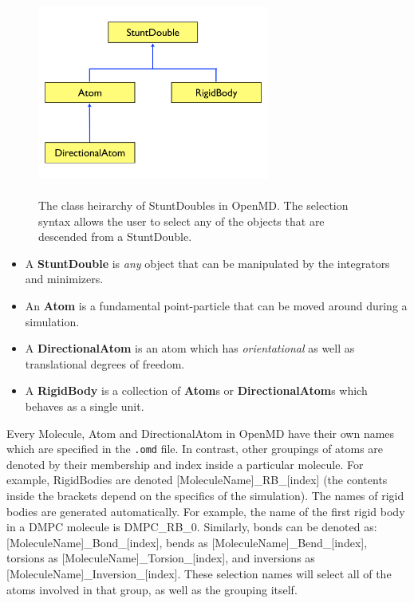 \documentclass[letterpaper]{report}
\begin{document}
\begin{figure}
\centering
\includegraphics[width=3in]{heirarchy.pdf}
\caption[Class heirarchy for StuntDoubles in OpenMD]{ \\ The
class heirarchy of StuntDoubles in OpenMD. The selection
syntax allows the user to select any of the objects that are descended
from a StuntDouble.}
\label{fig:heirarchy}
\end{figure}

\begin{itemize}
\item A {\bf StuntDouble} is {\it any} object that can be manipulated by the
integrators and minimizers. 
\item An {\bf Atom} is a fundamental point-particle that can be moved around during a simulation.
\item A {\bf DirectionalAtom} is an atom which has {\it orientational} as well as translational degrees of freedom.
\item A {\bf RigidBody} is a collection of {\bf Atom}s or {\bf
DirectionalAtom}s which behaves as a single unit.
\end{itemize} 

Every Molecule, Atom and DirectionalAtom in OpenMD have their
own names which are specified in the {\tt .omd} file. In contrast,
other groupings of atoms are denoted by their membership and index
inside a particular molecule.  For example, RigidBodies are denoted
[MoleculeName]\_RB\_[index] (the contents inside the brackets depend
on the specifics of the simulation). The names of rigid bodies are
generated automatically. For example, the name of the first rigid body
in a DMPC molecule is DMPC\_RB\_0.  Similarly, bonds can be denoted
as: [MoleculeName]\_Bond\_[index], bends as
[MoleculeName]\_Bend\_[index], torsions as
[MoleculeName]\_Torsion\_[index], and inversions as
[MoleculeName]\_Inversion\_[index].  These selection names will select
all of the atoms involved in that group, as well as the grouping
itself.  
\end{document}

